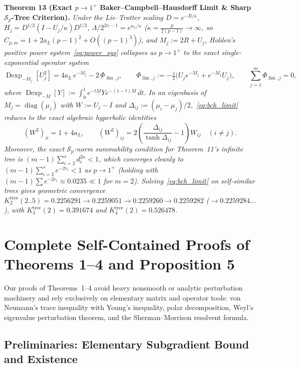 \documentclass[10pt,letterpaper]{article}
\newcommand{\Sp}{\mathcal{S}_p}
\newcommand{\diag}{\operatorname{diag}}
\begin{document}
\begin{tcolorbox}[mathbox]
\textbf{Theorem 13 (Exact $p \to 1^+$ Baker--Campbell--Hausdorff Limit \& Sharp $\Sp$-Tree Criterion).}
\emph{Under the Lie--Trotter scaling $D = e^{-R/\kappa}$, $H_j = D^{1/2}(I - U_j/\kappa)D^{1/2}$, $\Lambda / 2^{2\kappa-1} = e^{a_L/\kappa}$ ($\kappa = \frac{p}{2(p-1)} \to \infty$, so $C_{p,m} = 1 + 2a_L(p-1)^2 + O((p-1)^3)$), and $M_j := 2R + U_j$, Holden's positive power system~\eqref{eq:power_sys} collapses as $p \to 1^+$ to the exact single-exponential operator system}
\begin{equation}\label{eq:bch_limit}
  \operatorname{Dexp}_{-M_j}[U_j^2] = 4a_L\, e^{-M_j} - 2\,\Phi_{\lim,j},
  \qquad
  \Phi_{\lim,j} := -\tfrac{1}{2}\bigl(U_j e^{-M_j} + e^{-M_j} U_j\bigr),
  \qquad \sum_{j=1}^m \Phi_{\lim,j} = 0,
\end{equation}
\emph{where $\operatorname{Dexp}_{-M}[Y] := \int_0^1 e^{-tM} Y e^{-(1-t)M}\,dt$. In an eigenbasis of $M_j = \diag(\mu_i)$ with $W := U_j - I$ and $\Delta_{ij} := (\mu_i - \mu_j)/2$,~\eqref{eq:bch_limit} reduces to the exact algebraic hyperbolic identities}
\[
  (W^2)_{ii} = 1 + 4a_L,
  \qquad
  (W^2)_{ij} = 2\left(\frac{\Delta_{ij}}{\tanh \Delta_{ij}} - 1\right) W_{ij} \quad (i \neq j).
\]
\emph{Moreover, the exact $\Sp$-norm summability condition for Theorem~11's infinite tree is $(m - 1)\sum_{i=2}^s d_i^{2\kappa} < 1$, which converges cleanly to $(m-1)\sum_{i=2}^s e^{-2r_i} < 1$ as $p \to 1^+$ (holding with $(m-1)\sum e^{-2r_i} \approx 0.0235 \ll 1$ for $m = 2$). Solving~\eqref{eq:bch_limit} on self-similar trees gives geometric convergence $K_2^{\mathrm{tree}}(2..5) = 0.2256291 \to 0.2259051 \to 0.2259260 \to 0.2259282$ ($\to 0.2259284\dots$), with $K_3^{\mathrm{tree}}(2) = 0.391674$ and $K_4^{\mathrm{tree}}(2) = 0.526478$.}
\end{tcolorbox}

\section{Complete Self-Contained Proofs of Theorems 1--4 and Proposition 5}

Our proofs of Theorems~1--4 avoid heavy nonsmooth or analytic perturbation machinery and rely exclusively on elementary matrix and operator tools: von Neumann's trace inequality with Young's inequality, polar decomposition, Weyl's eigenvalue perturbation theorem, and the Sherman--Morrison resolvent formula.

\subsection{Preliminaries: Elementary Subgradient Bound and Existence}
\end{document}
